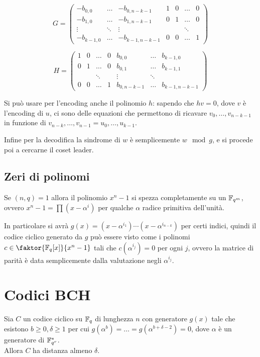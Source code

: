 \documentclass[a4paper]{book}
\begin{document}
    $$G=\begin{pmatrix}
    -b_{0,0} & \dots & -b_{0,n-k-1} & 1 & 0 & \dots & 0\\
    -b_{1,0} & \dots & -b_{1,n-k-1} & 0 & 1 & \dots & 0\\
    \vdots & \ddots & \vdots & & & \ddots  \\
    -b_{k-1,0} & \dots & -b_{k-1,n-k-1} & 0 & 0 & \dots & 1
    \end{pmatrix}$$

    $$H=\begin{pmatrix}
    1 & 0 & \dots & 0 & b_{0,0} & \dots & b_{k-1,0} \\
    0 & 1 & \dots & 0 & b_{0,1} & \dots & b_{k-1,1} \\
     & & \ddots  & & \vdots &  \ddots  \\
    0 & 0 & \dots & 1 & b_{0,n-k-1} & \dots & b_{k-1,n-k-1}
    \end{pmatrix}$$

    Si può usare per l'encoding anche il polinomio $h$: sapendo che $hv=0$, dove $v$ è l'encoding di $u$, ci sono delle equazioni che permettono di ricavare $v_0,\dots,v_{n-k-1}$
     in funzione di $v_{n-k},\dots,v_{n-1}=u_0,\dots,u_{k-1}$.

     \medskip
     Infine per la decodifica la sindrome di $w$ è semplicemente $w\mod g$, e si procede poi a cercarne il coset leader.

    \subsection{Zeri di polinomi}
    Se $(n,q)=1$ allora il polinomio $x^n-1$ si spezza completamente su un $\mathbb{F}_{q^m}$, ovvero $x^n-1=\prod(x-\alpha^i)$ per qualche $\alpha$ radice primitiva dell'unità.

    In particolare si avrà $g(x)=(x-\alpha^{i_1})\cdots(x-\alpha^{i_{n-k}})$ per certi indici, quindi il codice ciclico generato da $g$ può essere visto come i polinomi $c\in\faktor{\F_q[x]}{x^n-1}$ tali che $c(\alpha^{i_j})=0$ per ogni $j$, ovvero la matrice di parità è data semplicemente dalla valutazione negli $\alpha^{i_j}$.


    \section{Codici BCH}

    \begin{lemma}
        Sia $C$ un codice ciclico su $\mathbb{F}_q$ di lunghezza $n$ con generatore $g(x)$ tale che esistono $b\ge0,\delta\ge1$ per cui $g(\alpha^b)=\dots=g(\alpha^{b+\delta-2})=0$, dove $\alpha$ è un generatore di $\mathbb{F}_{q^r}^\ast$.\\
        Allora $C$ ha distanza almeno $\delta$.
    \end{lemma}
\end{document}
